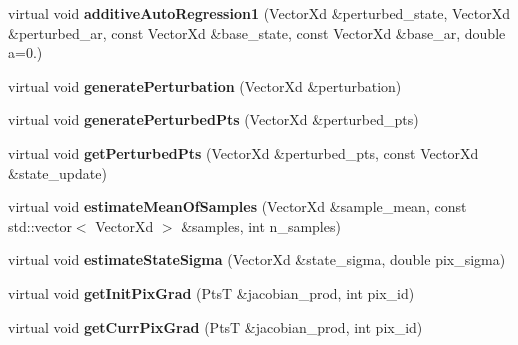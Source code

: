 \begin{DoxyCompactItemize}
\item 
\hypertarget{classStateSpaceModel_abe9acdd35a181bff35821026e65b7998}{virtual void {\bfseries additive\-Auto\-Regression1} (Vector\-Xd \&perturbed\-\_\-state, Vector\-Xd \&perturbed\-\_\-ar, const Vector\-Xd \&base\-\_\-state, const Vector\-Xd \&base\-\_\-ar, double a=0.)}\label{classStateSpaceModel_abe9acdd35a181bff35821026e65b7998}

\item 
\hypertarget{classStateSpaceModel_af2ca46965daa795113bbb2c3313687e1}{virtual void {\bfseries generate\-Perturbation} (Vector\-Xd \&perturbation)}\label{classStateSpaceModel_af2ca46965daa795113bbb2c3313687e1}

\item 
\hypertarget{classStateSpaceModel_aec2bf55b8d2579447210fcf52bd766ca}{virtual void {\bfseries generate\-Perturbed\-Pts} (Vector\-Xd \&perturbed\-\_\-pts)}\label{classStateSpaceModel_aec2bf55b8d2579447210fcf52bd766ca}

\item 
\hypertarget{classStateSpaceModel_aa0008179cfd5b2e7126fcd7d83193d2a}{virtual void {\bfseries get\-Perturbed\-Pts} (Vector\-Xd \&perturbed\-\_\-pts, const Vector\-Xd \&state\-\_\-update)}\label{classStateSpaceModel_aa0008179cfd5b2e7126fcd7d83193d2a}

\item 
\hypertarget{classStateSpaceModel_a5bff909bd0d35f8565324c2724066a66}{virtual void {\bfseries estimate\-Mean\-Of\-Samples} (Vector\-Xd \&sample\-\_\-mean, const std\-::vector$<$ Vector\-Xd $>$ \&samples, int n\-\_\-samples)}\label{classStateSpaceModel_a5bff909bd0d35f8565324c2724066a66}

\item 
\hypertarget{classStateSpaceModel_a68e7a798e0c7ac31ee79f5c856380b83}{virtual void {\bfseries estimate\-State\-Sigma} (Vector\-Xd \&state\-\_\-sigma, double pix\-\_\-sigma)}\label{classStateSpaceModel_a68e7a798e0c7ac31ee79f5c856380b83}

\item 
\hypertarget{classStateSpaceModel_a4dc4bcd0a4b9ca528fdd53f0423f5193}{virtual void {\bfseries get\-Init\-Pix\-Grad} (Pts\-T \&jacobian\-\_\-prod, int pix\-\_\-id)}\label{classStateSpaceModel_a4dc4bcd0a4b9ca528fdd53f0423f5193}

\item 
\hypertarget{classStateSpaceModel_a07f0bd621d26b539283f152ab45f29ab}{virtual void {\bfseries get\-Curr\-Pix\-Grad} (Pts\-T \&jacobian\-\_\-prod, int pix\-\_\-id)}\label{classStateSpaceModel_a07f0bd621d26b539283f152ab45f29ab}


\end{DoxyCompactItemize}
